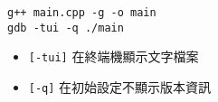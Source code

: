 \begin{lstlisting}
g++ main.cpp -g -o main
gdb -tui -q ./main
\end{lstlisting}
\begin{itemize}
    \item \verb|[-tui]| 在終端機顯示文字檔案
    \item \verb|[-q]| 在初始設定不顯示版本資訊
\end{itemize}